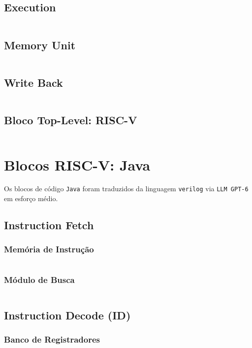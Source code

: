 \documentclass[12pt,a4paper,titlepage]{article}
\begin{document}
\clearpage\subsection{Execution}
\inputminted{v}{./code/verilog/ex_stage.v}

\subsection{Memory Unit}
\inputminted{v}{./code/verilog/mem_stage.v}

\subsection{Write Back}
\inputminted{v}{./code/verilog/wb_stage.v}

\clearpage
\subsection{Bloco Top-Level: RISC-V}
\inputminted{v}{./code/verilog/riscv_top.v}

\section{Blocos RISC-V: Java}
Os blocos de código \texttt{Java} foram traduzidos da linguagem \texttt{verilog} 
via \texttt{LLM GPT-6} em esforço médio.

\subsection{Instruction Fetch}
\subsubsection{Memória de Instrução}
\inputminted{java}{./code/java/instruction_memory.java}

\clearpage\subsubsection{Módulo de Busca}
\inputminted{java}{./code/java/if_stage.java}

\clearpage
\subsection{Instruction Decode (ID)}
\subsubsection{Banco de Registradores}
\inputminted{java}{./code/java/register_file.java}
\end{document}
